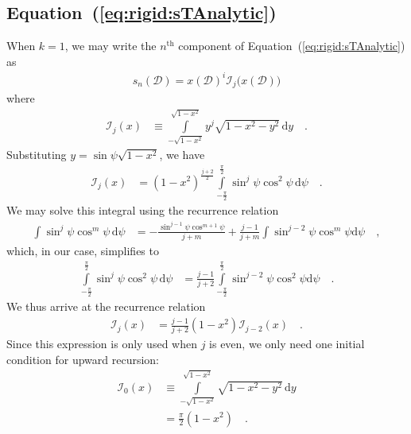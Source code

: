 \documentclass[modern]{aastex62}
\begin{document}
\subsection{Equation~(\ref{eq:rigid:sTAnalytic})}
%
When $k = 1$, we may write the $n^\mathrm{th}$ component
of Equation~(\ref{eq:rigid:sTAnalytic}) as
%
\begin{align}
    s_n(\mathcal{D}) = 
        x(\mathcal{D})^{i}
        \mathcal{I}_{j}\big(x(\mathcal{D})\big)
\end{align}
%
where
%
\begin{align}
    \mathcal{I}_j(x) &\equiv
    \int\limits_{-\sqrt{1-x^2}}^{\sqrt{1-x^2}}
        y^{j}
        \sqrt{1 - x^2 - y^2} \,
    \mathrm{d}y
    \quad.
\end{align}
%
Substituting $y = \sin\psi\sqrt{1 - x^2}$, we have
%
\begin{align}
    \mathcal{I}_j(x) &=
    (1 - x^2)^{\frac{j + 2}{2}}
    \int\limits_{-\frac{\pi}{2}}^{\frac{\pi}{2}}
        \sin^j\psi
        \cos^2\psi \,
    \mathrm{d}\psi
    \quad.
\end{align}
%
We may solve this integral using the recurrence relation
%
\begin{align}
    \int
        \sin^j\psi
        \cos^m\psi \,
    \mathrm{d}\psi
    &=
    -\frac{\sin^{j-1}\psi \cos^{m+1}\psi}{j + m}
    +
    \frac{j - 1}{j + m}\int\sin^{j-2}\psi \cos^m\psi \mathrm{d}\psi
    \quad ,
\end{align}
%
which, in our case, simplifies to
%
\begin{align}
    \int\limits_{-\frac{\pi}{2}}^{\frac{\pi}{2}}
        \sin^j\psi
        \cos^2\psi \,
    \mathrm{d}\psi
    &=
    \frac{j - 1}{j + 2}\int\limits_{-\frac{\pi}{2}}^
        {\frac{\pi}{2}}\sin^{j-2}\psi \cos^2\psi \mathrm{d}\psi
    \quad.
\end{align}
%
We thus arrive at the recurrence relation
%
\begin{align}
    \label{eq:app:Ij}
    \mathcal{I}_j(x) &=
    \frac{j - 1}{j + 2}
    (1 - x^2)
    \mathcal{I}_{j-2}(x)
    \quad.
\end{align}
%
Since this expression is only used when $j$ is even, we only need one
initial condition for upward recursion:
%
\begin{align}
    \label{eq:app:I0}
    \mathcal{I}_0(x) &\equiv
    \int\limits_{-\sqrt{1-x^2}}^{\sqrt{1-x^2}}
        \sqrt{1 - x^2 - y^2} \,
    \mathrm{d}y
    \nonumber \\
    &= \frac{\pi}{2}(1 - x^2)
    \quad.
\end{align}


\end{document}
